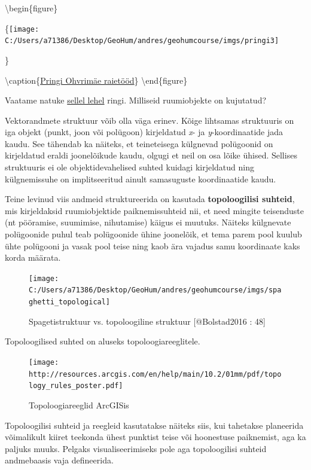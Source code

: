 \documentclass[
]{book}
\begin{document}
\textbackslash begin\{figure\}

\{\centering \texttt{[image: C:/Users/a71386/Desktop/GeoHum/andres/geohumcourse/imgs/pringi3]}

\}

\textbackslash caption\{\href{http://hiis.ee/files/ryystatud_pyhapaigad_2018.pdf}{Pringi Ohvrimäe raietööd}\}\label{fig:pringi3}
\textbackslash end\{figure\}

Vaatame natuke \href{http://orbis.stanford.edu/}{sellel lehel} ringi. Milliseid ruumiobjekte on kujutatud?

Vektorandmete struktuur võib olla väga erinev. Kõige lihtsamas struktuuris on iga objekt (punkt, joon või polügoon) kirjeldatud \emph{x}- ja \emph{y}-koordinaatide jada kaudu. See tähendab ka näiteks, et teineteisega külgnevad polügoonid on kirjeldatud eraldi joonelõikude kaudu, olgugi et neil on osa lõike ühised. Sellises struktuuris ei ole objektidevahelised suhted kuidagi kirjeldatud ning külgnemissuhe on implitseeritud ainult samasuguste koordinaatide kaudu.

Teine levinud viis andmeid struktureerida on kasutada \textbf{topoloogilisi suhteid}, mis kirjeldaksid ruumiobjektide paiknemissuhteid nii, et need mingite teisenduste (nt pööramise, suumimise, nihutamise) käigus ei muutuks. Näiteks külgnevate polügoonide puhul teab polügoonide ühine joonelõik, et tema parem pool kuulub ühte polügooni ja vasak pool teise ning kaob ära vajadus samu koordinaate kaks korda määrata.

\begin{figure}

{\centering \texttt{[image: C:/Users/a71386/Desktop/GeoHum/andres/geohumcourse/imgs/spaghetti\_topological]} 

}

\caption{Spagetistruktuur vs. topoloogiline struktuur [@Bolstad2016 : 48]}\label{fig:spaghetti-topological}
\end{figure}

Topoloogilised suhted on aluseks topoloogiareeglitele.

\begin{figure}
\centering
\texttt{[image: http://resources.arcgis.com/en/help/main/10.2/01mm/pdf/topology\_rules\_poster.pdf]}
\caption{Topoloogiareeglid ArcGISis}
\end{figure}

Topoloogilisi suhteid ja reegleid kasutatakse näiteks siis, kui tahetakse planeerida võimalikult kiiret teekonda ühest punktist teise või hoonestuse paiknemist, aga ka paljuks muuks. Pelgaks visualiseerimiseks pole aga topoloogilisi suhteid andmebaasis vaja defineerida.
\end{document}

